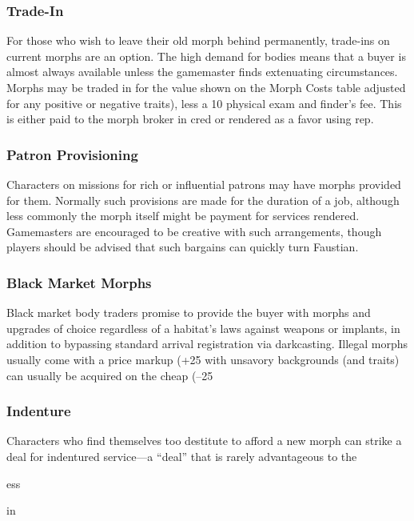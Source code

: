 \subsubsection{Trade-In}

For those who wish to leave their old morph behind 
permanently, trade-ins on current morphs are an 
option. The high demand for bodies means that a buyer 
is almost always available unless the gamemaster finds 
extenuating circumstances. Morphs may be traded in 
for the value shown on the Morph Costs table adjusted
for any positive or negative traits), less a 10%
physical exam and finder's fee. This is either paid to the 
morph broker in cred or rendered as a favor using rep.

\subsubsection{Patron Provisioning}

Characters on missions for rich or influential patrons 
may have morphs provided for them. Normally 
such provisions are made for the duration of a job, 
although less commonly the morph itself might be 
payment for services rendered. Gamemasters are 
encouraged to be creative with such arrangements, 
though players should be advised that such bargains 
can quickly turn Faustian.

\subsubsection{Black Market Morphs}

Black market body traders promise to provide the 
buyer with morphs and upgrades of choice regardless 
of a habitat's laws against weapons or implants, in 
addition to bypassing standard arrival registration 
via darkcasting. Illegal morphs usually come with a 
price markup (+25%
with unsavory backgrounds (and traits) can usually be 
acquired on the cheap (–25%

\subsubsection{Indenture}

Characters who find themselves too destitute to 
afford a new morph can strike a deal for indentured 
service—a ``deal'' that is rarely advantageous to the 

ess

in 


